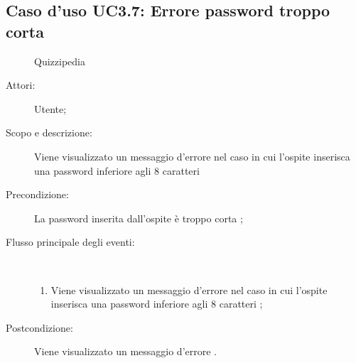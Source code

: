 \subsection{Caso d'uso UC3.7: Errore password troppo corta}
	\begin{figure}[H]
		\centering
		\begin{resizedtikzpicture}{\textwidth}
		\begin{umlsystem}[x=0, fill=lightgray!20]{Quizzipedia}
		\end{umlsystem}
		\end{resizedtikzpicture}
		\caption{}
	\end{figure}
\begin{description}
\item[Attori:] Utente;
\item[Scopo e descrizione:] Viene visualizzato un messaggio d'errore nel caso in cui l'ospite inserisca una password inferiore agli 8 caratteri

      \item[Precondizione:] La password inserita dall'ospite è troppo corta
;

        \item[Flusso principale degli eventi:] \ 
 \begin{enumerate}
          \item Viene visualizzato un messaggio d'errore nel caso in cui l'ospite inserisca una password inferiore agli 8 caratteri	;

      \end{enumerate}
    \item[Postcondizione:] Viene visualizzato un messaggio d'errore
.
  \end{description}
\hypertarget{UC4}{}
